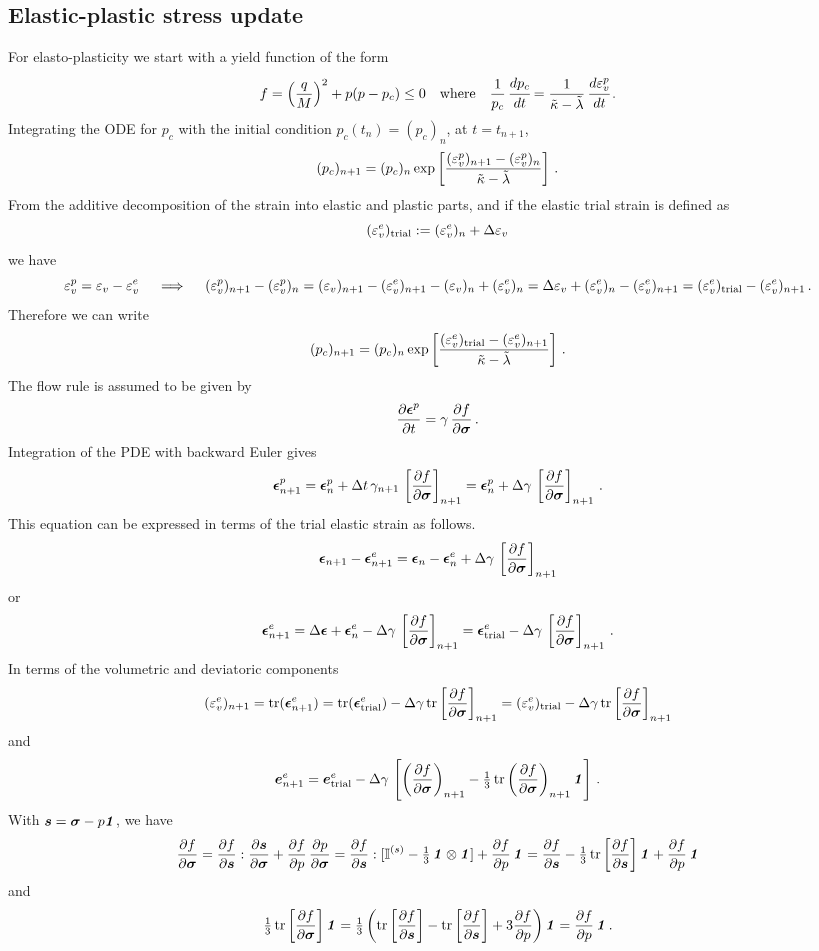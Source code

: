 \subsection{Elastic-plastic stress update}
For elasto-plasticity we start with a yield function of the form
\[
   f = \left(\frac{q}{M}\right)^2 + p(p-p_c) \le 0 
   \quad \text{where} \quad
  \frac{1}{p_c}\,\Deriv{p_c}{t} = \frac{1}{\kappatilde-\lambdatilde}\,\Deriv{\Ve_v^p}{t} \,.
\]
Integrating the ODE for $p_c$ with the initial condition $p_c(t_n) = (p_c)_n$, at $t = t_{n+1}$, 
\[
   (p_c)_{n+1} = (p_c)_n \exp\left[\frac{(\Ve_v^p)_{n+1} - (\Ve_v^p)_n}{\kappatilde-\lambdatilde}\right] \,.
\]
From the additive decomposition of the strain into elastic and plastic parts, and if the elastic trial 
strain is defined as 
\[
   (\Ve_v^e)_\Trial := (\Ve_v^e)_n + \Delta\Ve_v
\]
we have
\[
   \Ve_v^p = \Ve_v - \Ve_v^e \quad \implies \quad
   (\Ve_v^p)_{n+1} - (\Ve_v^p)_n = (\Ve_v)_{n+1} - (\Ve_v^e)_{n+1} - (\Ve_v)_{n} + (\Ve_v^e)_{n} 
                               = \Delta\Ve_v + (\Ve_v^e)_{n} - (\Ve_v^e)_{n+1} 
                               = (\Ve_v^e)_\Trial - (\Ve_v^e)_{n+1} \,.
\]
Therefore we can write
\[
   (p_c)_{n+1} = (p_c)_n \exp\left[\frac{(\Ve_v^e)_\Trial - (\Ve_v^e)_{n+1}}{\kappatilde-\lambdatilde}\right] \,.
\]
The flow rule is assumed to be given by
\[
   \Partial{\Beps^p}{t} = \gamma\,\Partial{f}{\Bsig} \,.
\]
Integration of the PDE with backward Euler gives
\[
  \Beps^p_{n+1} = \Beps^p_n + \Delta t\,\gamma_{n+1}\,\left[\Partial{f}{\Bsig}\right]_{n+1} 
             = \Beps^p_n + \Delta\gamma\,\left[\Partial{f}{\Bsig}\right]_{n+1} \,.
\]
This equation can be expressed in terms of the trial elastic strain as follows.
\[
  \Beps_{n+1}-\Beps^e_{n+1} = \Beps_n - \Beps^e_n + \Delta\gamma\,\left[\Partial{f}{\Bsig}\right]_{n+1} 
\]
or
\[
  \Beps^e_{n+1} = \Delta\Beps + \Beps^e_n - \Delta\gamma\,\left[\Partial{f}{\Bsig}\right]_{n+1} 
             = \Beps^e_\Trial - \Delta\gamma\,\left[\Partial{f}{\Bsig}\right]_{n+1} \,.
\]
In terms of the volumetric and deviatoric components
\[
  (\Ve_v^e)_{n+1} = \Tr(\Beps^e_{n+1}) = \Tr(\Beps^e_\Trial) - \Delta\gamma\,\Tr\left[\Partial{f}{\Bsig}\right]_{n+1} = (\Ve_v^e)_\Trial - \Delta\gamma\,\Tr\left[\Partial{f}{\Bsig}\right]_{n+1} 
\]
and
\[
  \BeT^e_{n+1} = \BeT^e_\Trial - \Delta\gamma\,\left[\left(\Partial{f}{\Bsig}\right)_{n+1}
      - \tfrac{1}{3}\,\Tr\left(\Partial{f}{\Bsig}\right)_{n+1}\Bone\right] \,.
\]
With $\BsT = \Bsig - p\Bone$, we have
\[
  \Partial{f}{\Bsig} = \Partial{f}{\BsT}:\Partial{\BsT}{\Bsig} + \Partial{f}{p}\,\Partial{p}{\Bsig}
    = \Partial{f}{\BsT}:[\SfI^{(s)} - \tfrac{1}{3}\,\Bone\otimes\Bone] 
      + \Partial{f}{p}\,\Bone
    = \Partial{f}{\BsT} - \tfrac{1}{3}\,\Tr\left[\Partial{f}{\BsT}\right]\Bone
      + \Partial{f}{p}\,\Bone
\]
and
\[
  \tfrac{1}{3}\,\Tr\left[\Partial{f}{\Bsig}\right]\Bone = 
    \tfrac{1}{3}\left(\Tr\left[\Partial{f}{\BsT}\right] - \Tr\left[\Partial{f}{\BsT}\right]
      + 3\Partial{f}{p}\right)\Bone  =  \Partial{f}{p}\,\Bone \,.
\]

